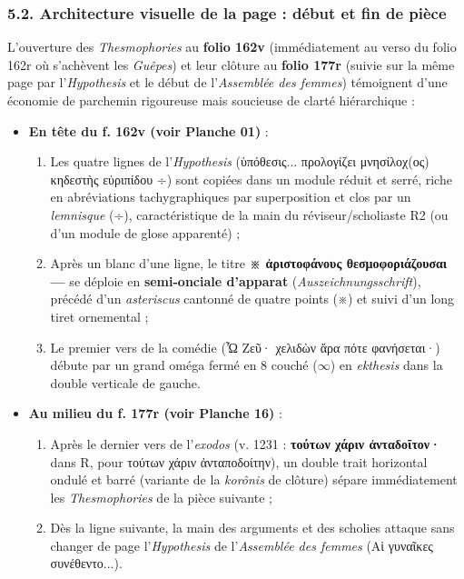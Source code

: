 \documentclass[11pt, a4paper, twoside]{article}
\renewcommand{\_}{\origunderscore\penalty0\relax}
\renewcommand{\texttt}[1]{#1}
\newcommand{\R}{\textbf{R}}
\newcommand{\Rdeux}{\textbf{R}\textsuperscript{2}}
\def\R{R}%
\def\Rdeux{R2}%
\begin{document}
\subsubsection{5.2. Architecture visuelle de la page : début et fin de pièce}

L'ouverture des \textit{Thesmophories} au \textbf{folio \texttt{162v}} (immédiatement au verso du folio \texttt{162r} où s'achèvent les \textit{Guêpes}) et leur clôture au \textbf{folio \texttt{177r}} (suivie sur la même page par l'\textit{Hypothesis} et le début de l'\textit{Assemblée des femmes}) témoignent d'une économie de parchemin rigoureuse mais soucieuse de clarté hiérarchique :
\begin{itemize}[leftmargin=1.5em, itemsep=2pt]
  \item \textbf{En tête du \texttt{f. 162v} (voir Planche 01)} :
  \begin{enumerate}[leftmargin=1.6em, itemsep=2pt]
    \item Les quatre lignes de l'\textit{Hypothesis} (\texttt{ὑπόθεσις... προλογίζει μνησίλοχ(ος) κηδεστὴς εὐριπίδου ÷}) sont copiées dans un module réduit et serré, riche en abréviations tachygraphiques par superposition et clos par un \textit{lemnisque} (\texttt{÷}), caractéristique de la main du réviseur/scholiaste \Rdeux{} (ou d'un module de glose apparenté) ;
    \item Après un blanc d'une ligne, le titre \textbf{\texttt{※ ἀριστοφάνους θεσμοφοριάζουσαι —}} se déploie en \textbf{semi-onciale d'apparat} (\textit{Auszeichnungsschrift}), précédé d'un \textit{asteriscus} cantonné de quatre points (\texttt{※}) et suivi d'un long tiret ornemental ;
    \item Le premier vers de la comédie (\texttt{Ὦ Ζεῦ· χελιδὼν ἄρα πότε φανήσεται·}) débute par un grand oméga fermé en \texttt{8} couché ($\infty$) en \textit{ekthesis} dans la double verticale de gauche.
  \end{enumerate}
  \item \textbf{Au milieu du \texttt{f. 177r} (voir Planche 16)} :
  \begin{enumerate}[leftmargin=1.6em, itemsep=2pt]
    \item Après le dernier vers de l'\textit{exodos} (\texttt{v. 1231} : \textbf{\texttt{τούτων χάριν ἀνταδοῖτον·}} dans \R{}, pour \texttt{τούτων χάριν ἀνταποδοίτην}), un double trait horizontal ondulé et barré (variante de la \textit{korônis} de clôture) sépare immédiatement les \textit{Thesmophories} de la pièce suivante ;
    \item Dès la ligne suivante, la main des arguments et des scholies attaque sans changer de page l'\textit{Hypothesis} de l'\textit{Assemblée des femmes} (\texttt{Αἱ γυναῖκες συνέθεντο...}).
  \end{enumerate}
\end{itemize}
\end{document}
